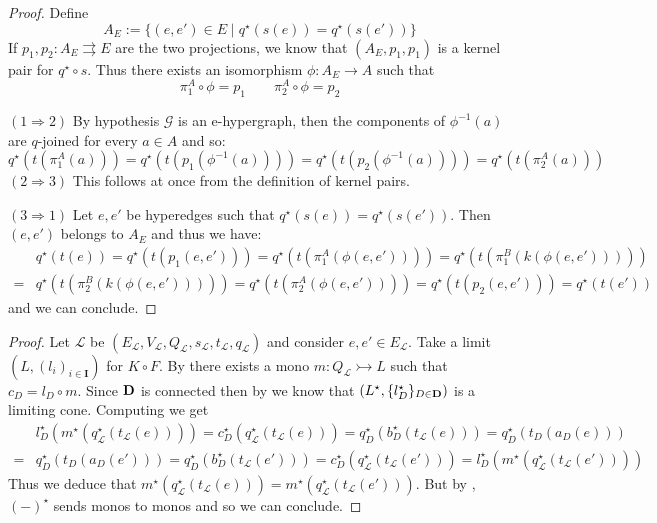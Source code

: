 \documentclass[3p]{elsarticle}
\newcommand{\cat}[1]{\ensuremath{\mathbf{#1}}}
\def\D{\textbf {\textup{D}}}
\newcommand{\mto}{\rightarrowtail}
\theoremstyle{remark}
\theoremstyle{definition}
\begin{document}
\eh*
\begin{proof}\label{proof:eh}  Define
	\[A_E:=\{(e,e')\in E \mid q^\star(s(e))=q^\star(s(e'))\}\] 
	If $p_1, p_2\colon A_E\rightrightarrows E$ are the two projections, we know that $(A_E, p_1, p_1)$ is a kernel pair for $q^\star \circ s$. Thus there exists an isomorphism $\phi \colon A_E\to A$ such that 
	\[\pi^A_1\circ \phi =p_1 \qquad \pi^A_2\circ \phi = p_2\]
	
	\smallskip \noindent
	$(1\Rightarrow 2)$ By hypothesis $\mathcal{G}$ is an e-hypergraph, then the components of $\phi^{-1}(a)$ are $q$-joined for every $a\in A$ and so:
	\[q^\star(t(\pi^A_1(a)))=q^\star(t(p_1(\phi^{-1}(a))))=q^\star(t(p_2(\phi^{-1}(a))))=q^\star(t(\pi^A_2(a)))\]
	\smallskip \noindent $(2\Rightarrow 3)$ This follows at once from the definition of kernel pairs.
	
	\smallskip \noindent $(3\Rightarrow 1)$ Let $e, e'$ be hyperedges such that $q^\star(s(e))=q^\star(s(e'))$. Then $(e,e')$ belongs to $A_E$ and thus we have:
	\begin{align*}
		&q^\star(t(e))=q^\star(t(p_1(e, e')))=q^\star(t(\pi^A_1(\phi(e,e'))))=q^\star(t(\pi^B_1(k(\phi(e,e')))))\\=&q^\star(t(\pi^B_2(k(\phi(e,e')))))=q^\star(t(\pi^A_2(\phi(e,e'))))=q^\star(t(p_2(e, e')))=q^\star(t(e'))
	\end{align*}
	and we can conclude. \qedhere 
	
\end{proof}


\elim*
\begin{proof}\label{proof:elim}
	Let $\mathcal{L}$ be $(E_{\mathcal{L}}, V_{\mathcal{L}}, Q_{\mathcal{L}}, s_{\mathcal{L}}, t_{\mathcal{L}}, q_{\mathcal{L}})$ and consider $e, e'\in E_{\mathcal{L}}$.
	Take a limit $(L, (l_i)_{i \in \cat I})$ for $K \circ F$. By  there exists a mono $m\colon Q_{\mathcal{L}} \mto L$ such that $c_D = l_D \circ m$. Since $\D$ is connected then by  we know that $(L^\star, \{l^\star_D\}_{D\in \D})$ is a limiting cone. Computing we get
	\begin{align*}
		&l^\star_D(m^\star(q_{\mathcal{L}}^\star(t_{\mathcal{L}}(e))))=c^\star_D(q_{\mathcal{L}}^\star(t_\mathcal{L}(e)))=q^\star_D(b^\star_D(t_\mathcal{L}(e)))=q^\star_D(t_D(a_D(e)))\\=&q^\star_D(t_D(a_D(e')))=q^\star_D(b^\star_D(t_\mathcal{L}(e')))=c^\star_D(q_{\mathcal{L}}^\star(t_\mathcal{L}(e')))=l^\star_D(m^\star(q_{\mathcal{L}}^\star(t_{\mathcal{L}}(e'))))
	\end{align*} 
	Thus we deduce that $m^\star(q_{\mathcal{L}}^\star(t_{\mathcal{L}}(e)))=m^\star(q_{\mathcal{L}}^\star(t_{\mathcal{L}}(e')))$. But by , $(-)^\star$ sends monos to monos and so we can conclude.
\end{proof}
\end{document}
